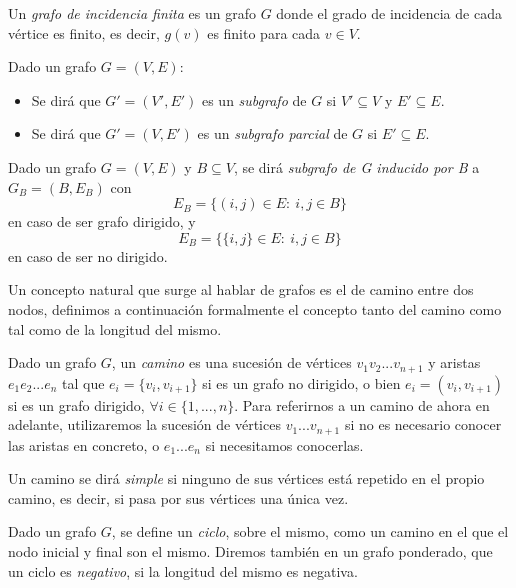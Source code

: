 \begin{definicion}
	Un \textit{grafo de incidencia finita} es un grafo $G$ donde el grado de incidencia de cada vértice es finito, es decir, $g(v)$ es finito para cada $v\in V$.
\end{definicion}

\begin{definicion}
	Dado un grafo $G=(V,E)$: 
	\begin{itemize}
		\item Se dirá que $G'=(V',E')$ es un \textit{subgrafo} de $G$ si $V'\subseteq V$ y $E'\subseteq E$.
		\item Se dirá que $G'=(V,E')$ es un \textit{subgrafo parcial} de $G$ si $E'\subseteq E$.
	\end{itemize} 
\end{definicion}

\begin{definicion}
	Dado un grafo $G=(V,E)$ y $B\subseteq V$, se dirá \textit{subgrafo de G inducido por B} a $G_B=(B,E_B)$ con
	$$E_B=\{(i,j)\in E:\ i,j\in B\}$$
	en caso de ser grafo dirigido, y
	$$E_B=\{\{i,j\}\in E:\ i,j\in B\}$$
	en caso de ser no dirigido.
\end{definicion}

Un concepto natural que surge al hablar de grafos es el de camino entre dos nodos, definimos a continuación formalmente el concepto tanto del camino como tal como de la longitud del mismo.

\begin{definicion}
	Dado un grafo $G$, un \textit{camino} es una sucesión de vértices $v_1v_2...v_{n+1}$ y aristas $e_1e_2...e_n$ tal que $e_i=\{v_i,v_{i+1}\}$ si es un grafo no dirigido, o bien $e_i=(v_i,v_{i+1})$ si es un grafo dirigido, $\forall i \in \{1,...,n\}$. Para referirnos a un camino de ahora en adelante, utilizaremos la sucesión de vértices $v_1...v_{n+1}$ si no es necesario conocer las aristas en concreto, o $e_1...e_n$ si necesitamos conocerlas.
\end{definicion}

\begin{definicion}
	Un camino se dirá \textit{simple} si ninguno de sus vértices está repetido en el propio camino, es decir, si pasa por sus vértices una única vez.
\end{definicion}

\begin{definicion}
	Dado un grafo $G$, se define un \textit{ciclo}, sobre el mismo, como un camino en el que el nodo inicial y final son el mismo. Diremos también en un grafo ponderado, que un ciclo es \textit{negativo}, si la longitud del mismo es negativa.
\end{definicion}

